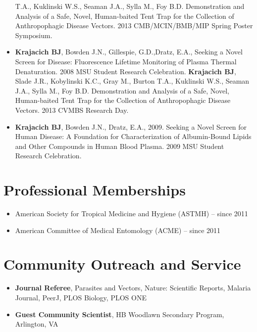 \documentclass[11pt, a4paper]{awesome-cv}
\begin{document}
\begin{itemize}
  T.A., Kuklinski W.S., Seaman J.A., Sylla M., Foy B.D. Demonstration
  and Analysis of a Safe, Novel, Human-baited Tent Trap for the
  Collection of Anthropophagic Disease Vectors. 2013 CMB/MCIN/BMB/MIP
  Spring Poster Symposium.
\item
  \textbf{Krajacich BJ}, Bowden J.N., Gillespie, G.D.,Dratz, E.A.,
  Seeking a Novel Screen for Disease: Fluorescence Lifetime Monitoring
  of Plasma Thermal Denaturation. 2008 MSU Student Research Celebration.
  \textbf{Krajacich BJ}, Slade J.R., Kobylinski K.C., Gray M., Burton
  T.A., Kuklinski W.S., Seaman J.A., Sylla M., Foy B.D. Demonstration
  and Analysis of a Safe, Novel, Human-baited Tent Trap for the
  Collection of Anthropophagic Disease Vectors. 2013 CVMBS Research Day.
\item
  \textbf{Krajacich BJ}, Bowden J.N., Dratz, E.A., 2009. Seeking a Novel
  Screen for Human Disease: A Foundation for Characterization of
  Albumin-Bound Lipids and Other Compounds in Human Blood Plasma. 2009
  MSU Student Research Celebration.
\end{itemize}

\hypertarget{professional-memberships}{%
\section{Professional Memberships}\label{professional-memberships}}

\begin{itemize}
\item
  American Society for Tropical Medicine and Hygiene (ASTMH) -- since
  2011
\item
  American Committee of Medical Entomology (ACME) -- since 2011
\end{itemize}

\hypertarget{community-outreach-and-service}{%
\section{Community Outreach and
Service}\label{community-outreach-and-service}}

\begin{itemize}
\item
  \textbf{Journal Referee}, Parasites and Vectors, Nature: Scientific
  Reports, Malaria Journal, PeerJ, PLOS Biology, PLOS ONE
\item
  \textbf{Guest Community Scientist}, HB Woodlawn Secondary Program,
  Arlington, VA
\end{itemize}
\end{document}
